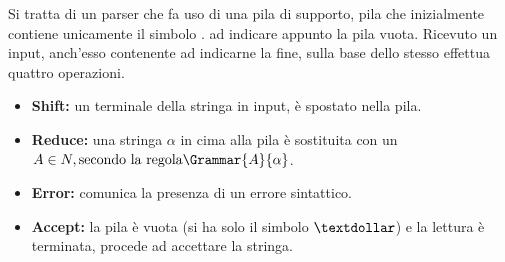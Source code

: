 \documentclass{subfiles}
\begin{document}
Si tratta di un parser che fa uso di una pila di supporto, pila che inizialmente contiene unicamente il simbolo \textdollar.
ad indicare appunto la pila vuota. Ricevuto un input, anch'esso contenente \textdollar ad indicarne la fine,
sulla base dello stesso effettua quattro operazioni.
\begin{itemize}
    \item \textbf{Shift:} un terminale della stringa in input, è spostato nella pila.
    \item \textbf{Reduce:} una stringa $\alpha$ in cima alla pila è sostituita con un $A \in N, \text{secondo la regola} \Grammar{A}{\alpha}$.
    \item \textbf{Error:} comunica la presenza di un errore sintattico.
    \item \textbf{Accept:} la pila è vuota (si ha solo il simbolo $\textdollar$) e la lettura è terminata,
          procede ad accettare la stringa.
\end{itemize}
\end{document}
